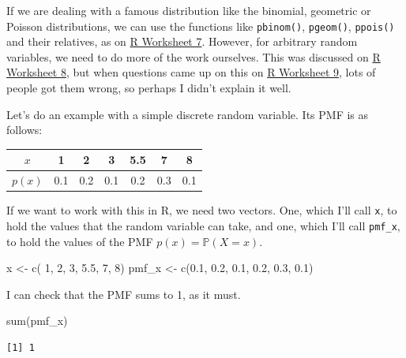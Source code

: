 \documentclass[
  letterpaper,
]{report}
\newenvironment{Shaded}{\begin{snugshade}}{\end{snugshade}}
\newcommand{\DecValTok}[1]{\textcolor[rgb]{0.68,0.00,0.00}{#1}}
\newcommand{\FloatTok}[1]{\textcolor[rgb]{0.68,0.00,0.00}{#1}}
\newcommand{\FunctionTok}[1]{\textcolor[rgb]{0.28,0.35,0.67}{#1}}
\newcommand{\NormalTok}[1]{\textcolor[rgb]{0.00,0.23,0.31}{#1}}
\newcommand{\OtherTok}[1]{\textcolor[rgb]{0.00,0.23,0.31}{#1}}
\theoremstyle{definition}
\theoremstyle{definition}
\theoremstyle{remark}
\begin{document}
If we are dealing with a famous distribution like the binomial,
geometric or Poisson distributions, we can use the functions like
\texttt{pbinom()}, \texttt{pgeom()}, \texttt{ppois()} and their
relatives, as on \protect\hyperlink{R}{R Worksheet 7}. However, for
arbitrary random variables, we need to do more of the work ourselves.
This was discussed on \protect\hyperlink{R}{R Worksheet 8}, but when
questions came up on this on \protect\hyperlink{R}{R Worksheet 9}, lots
of people got them wrong, so perhaps I didn't explain it well.

Let's do an example with a simple discrete random variable. Its PMF is
as follows:

\begin{longtable}[]{@{}ccccccc@{}}
\toprule()
\(x\) & 1 & 2 & 3 & 5.5 & 7 & 8 \\
\midrule()
\endhead
\(p(x)\) & 0.1 & 0.2 & 0.1 & 0.2 & 0.3 & 0.1 \\
\bottomrule()
\end{longtable}

If we want to work with this in R, we need two vectors. One, which I'll
call \texttt{x}, to hold the values that the random variable can take,
and one, which I'll call \texttt{pmf\_x}, to hold the values of the PMF
\(p(x) = \mathbb P(X = x)\).

\begin{Shaded}
\begin{Highlighting}[]
\NormalTok{x     }\OtherTok{\textless{}{-}} \FunctionTok{c}\NormalTok{(  }\DecValTok{1}\NormalTok{,   }\DecValTok{2}\NormalTok{,   }\DecValTok{3}\NormalTok{, }\FloatTok{5.5}\NormalTok{,   }\DecValTok{7}\NormalTok{,   }\DecValTok{8}\NormalTok{)}
\NormalTok{pmf\_x }\OtherTok{\textless{}{-}} \FunctionTok{c}\NormalTok{(}\FloatTok{0.1}\NormalTok{, }\FloatTok{0.2}\NormalTok{, }\FloatTok{0.1}\NormalTok{, }\FloatTok{0.2}\NormalTok{, }\FloatTok{0.3}\NormalTok{, }\FloatTok{0.1}\NormalTok{)}
\end{Highlighting}
\end{Shaded}

I can check that the PMF sums to 1, as it must.

\begin{Shaded}
\begin{Highlighting}[]
\FunctionTok{sum}\NormalTok{(pmf\_x)}
\end{Highlighting}
\end{Shaded}

\begin{verbatim}
[1] 1
\end{verbatim}
\end{document}
